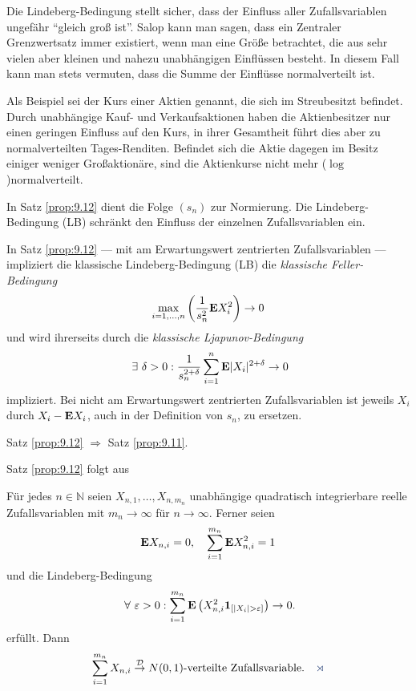 Die Lindeberg-Bedingung stellt sicher, dass der Einfluss aller Zufallsvariablen
ungefähr ``gleich groß ist''. Salop kann man sagen, dass ein Zentraler
Grenzwertsatz immer existiert, wenn man eine Größe betrachtet, die aus sehr
vielen aber kleinen und nahezu unabhängigen Einflüssen besteht. In diesem Fall
kann man stets vermuten, dass die Summe der Einflüsse normalverteilt ist.

Als Beispiel sei der Kurs einer Aktien genannt, die sich im Streubesitzt
befindet. Durch unabhängige Kauf- und Verkaufsaktionen haben die Aktienbesitzer
nur einen geringen Einfluss auf den Kurs, in ihrer Gesamtheit führt dies aber
zu normalverteilten Tages-Renditen. Befindet sich die Aktie dagegen im Besitz
einiger weniger Großaktionäre, sind die Aktienkurse  nicht mehr
($\log$)\-normalverteilt.

\begin{bem}[Bemerkungen.]
\label{bem:9.3}
\begin{bemenum}%
\item In Satz \ref{prop:9.12} dient die Folge $(s_n)$ zur Normierung. Die
  Lindeberg-Bedingung (LB) schränkt den Einfluss der einzelnen Zufallsvariablen ein.
\item In Satz \ref{prop:9.12} --- mit am Erwartungswert zentrierten Zufallsvariablen ---
  impliziert die klassische Lindeberg-Bedingung (LB) die \emph{klassische
  Feller-Bedingung}
\begin{align*}
\max\limits_{i=1,\ldots,n} \left(\frac{1}{s^{2}_{n}}\textbf{E} X^ {2}_{i}\right)
\to 0
\end{align*}
und wird ihrerseits durch die \emph{klassische Ljapunov-Bedingung}
\begin{align*}
\exists \delta > 0 : \frac{1}{s^ {2+\delta }_{n}}
\sum\limits^ {n}_{i=1} \E|X_{i}| ^ {2+\delta }\to 0
\end{align*}
impliziert. Bei nicht am Erwartungswert zentrierten Zufallsvariablen ist jeweils $X_{i}$
durch $X_{i}-\textbf{E} X_{i}$, auch in der Definition von $s_{n}$, zu ersetzen.
\item
Satz \ref{prop:9.12} $\Rightarrow $ Satz \ref{prop:9.11}.\maphere
\end{bemenum}
\end{bem}

Satz \ref{prop:9.12} folgt aus

\begin{prop}
\label{prop:9.13}
Für jedes $n\in\mathbb{N}$ seien
$X_{n,1},\ldots,X_{n,m_n}$ unabhängige quadratisch integrierbare reelle
Zufallsvariablen mit $m_n\to \infty$ für $n\to\infty$. Ferner seien
\begin{align*}
\textbf{E} X_{n,i}=0,\quad \sum_{i=1}^{m_n} \textbf{E} X_{n,i}^2=1
\end{align*}
und die Lindeberg-Bedingung
\begin{align*}
\forall \ep > 0 : \sum^{m_n}_{i=1}
\E\left(X^{2}_{n,i}\Id_{ [|X_{i}| > \ep]}\right) \to 0.
\end{align*}
erfüllt.  Dann
\begin{align*}
\sum\limits^{m_n}_{i=1}X_{n,i}\Dto
N(0,1)\mbox{-verteilte Zufallsvariable.}\fishhere
\end{align*}
\end{prop}

